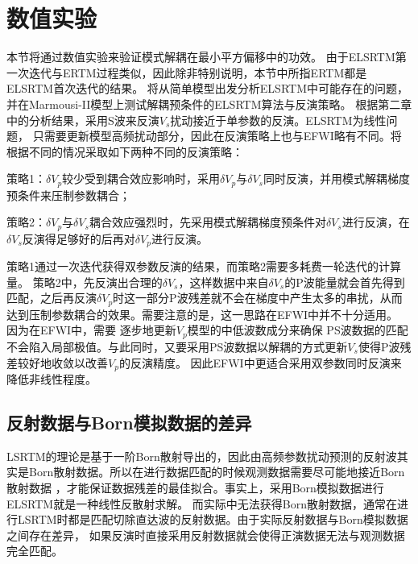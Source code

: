 \section{数值实验}
本节将通过数值实验来验证模式解耦在最小平方偏移中的功效。
由于ELSRTM第一次迭代与ERTM过程类似，因此除非特别说明，本节中所指ERTM都是ELSRTM首次迭代的结果。
将从简单模型出发分析ELSRTM中可能存在的问题，并在Marmousi-II模型上测试解耦预条件的ELSRTM算法与反演策略。
根据第二章中的分析结果，采用S波来反演$V_s$扰动接近于单参数的反演。ELSRTM为线性问题，
只需要更新模型高频扰动部分，因此在反演策略上也与EFWI略有不同。将根据不同的情况采取如下两种不同的反演策略：

策略1：$\delta V_p$较少受到耦合效应影响时，采用$\delta V_p$与$\delta
V_s$同时反演，并用模式解耦梯度预条件来压制参数耦合；

策略2：$\delta V_p$与$\delta V_s$耦合效应强烈时，先采用模式解耦梯度预条件对$\delta V_s$进行反演，在$\delta
V_s$反演得足够好的后再对$\delta V_p$进行反演。

策略1通过一次迭代获得双参数反演的结果，而策略2需要多耗费一轮迭代的计算量。
策略2中，先反演出合理的$\delta V_s$，这样数据中来自$\delta
V_s$的P波能量就会首先得到匹配，之后再反演$\delta
V_p$时这一部分P波残差就不会在梯度中产生太多的串扰，从而达到压制参数耦合的效果。需要注意的是，这一思路在EFWI中并不十分适用。
因为在EFWI中，需要
逐步地更新$V_p$模型的中低波数成分来确保
PS波数据的匹配不会陷入局部极值。与此同时，又要采用PS波数据以解耦的方式更新$V_s$使得P波残差较好地收敛以改善$V_p$的反演精度。
因此EFWI中更适合采用双参数同时反演来降低非线性程度。


\subsection{反射数据与Born模拟数据的差异}
LSRTM的理论是基于一阶Born散射导出的，因此由高频参数扰动预测的反射波其实是Born散射数据。所以在进行数据匹配的时候观测数据需要尽可能地接近Born散射数据
，才能保证数据残差的最佳拟合。事实上，采用Born模拟数据进行ELSRTM就是一种线性反散射求解。
而实际中无法获得Born散射数据，通常在进行LSRTM时都是匹配切除直达波的反射数据。由于实际反射数据与Born模拟数据之间存在差异，
如果反演时直接采用反射数据就会使得正演数据无法与观测数据完全匹配。

